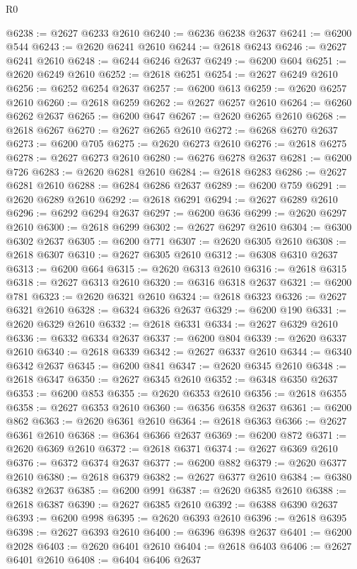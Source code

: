 \begin{lexlean}{R0}
\begin{coremodule}
@6238 := @2627 @6233 @2610
@6240 := @6236 @6238 @2637
@6241 := @6200 @544
@6243 := @2620 @6241 @2610
@6244 := @2618 @6243
@6246 := @2627 @6241 @2610
@6248 := @6244 @6246 @2637
@6249 := @6200 @604
@6251 := @2620 @6249 @2610
@6252 := @2618 @6251
@6254 := @2627 @6249 @2610
@6256 := @6252 @6254 @2637
@6257 := @6200 @613
@6259 := @2620 @6257 @2610
@6260 := @2618 @6259
@6262 := @2627 @6257 @2610
@6264 := @6260 @6262 @2637
@6265 := @6200 @647
@6267 := @2620 @6265 @2610
@6268 := @2618 @6267
@6270 := @2627 @6265 @2610
@6272 := @6268 @6270 @2637
@6273 := @6200 @705
@6275 := @2620 @6273 @2610
@6276 := @2618 @6275
@6278 := @2627 @6273 @2610
@6280 := @6276 @6278 @2637
@6281 := @6200 @726
@6283 := @2620 @6281 @2610
@6284 := @2618 @6283
@6286 := @2627 @6281 @2610
@6288 := @6284 @6286 @2637
@6289 := @6200 @759
@6291 := @2620 @6289 @2610
@6292 := @2618 @6291
@6294 := @2627 @6289 @2610
@6296 := @6292 @6294 @2637
@6297 := @6200 @636
@6299 := @2620 @6297 @2610
@6300 := @2618 @6299
@6302 := @2627 @6297 @2610
@6304 := @6300 @6302 @2637
@6305 := @6200 @771
@6307 := @2620 @6305 @2610
@6308 := @2618 @6307
@6310 := @2627 @6305 @2610
@6312 := @6308 @6310 @2637
@6313 := @6200 @664
@6315 := @2620 @6313 @2610
@6316 := @2618 @6315
@6318 := @2627 @6313 @2610
@6320 := @6316 @6318 @2637
@6321 := @6200 @781
@6323 := @2620 @6321 @2610
@6324 := @2618 @6323
@6326 := @2627 @6321 @2610
@6328 := @6324 @6326 @2637
@6329 := @6200 @190
@6331 := @2620 @6329 @2610
@6332 := @2618 @6331
@6334 := @2627 @6329 @2610
@6336 := @6332 @6334 @2637
@6337 := @6200 @804
@6339 := @2620 @6337 @2610
@6340 := @2618 @6339
@6342 := @2627 @6337 @2610
@6344 := @6340 @6342 @2637
@6345 := @6200 @841
@6347 := @2620 @6345 @2610
@6348 := @2618 @6347
@6350 := @2627 @6345 @2610
@6352 := @6348 @6350 @2637
@6353 := @6200 @853
@6355 := @2620 @6353 @2610
@6356 := @2618 @6355
@6358 := @2627 @6353 @2610
@6360 := @6356 @6358 @2637
@6361 := @6200 @862
@6363 := @2620 @6361 @2610
@6364 := @2618 @6363
@6366 := @2627 @6361 @2610
@6368 := @6364 @6366 @2637
@6369 := @6200 @872
@6371 := @2620 @6369 @2610
@6372 := @2618 @6371
@6374 := @2627 @6369 @2610
@6376 := @6372 @6374 @2637
@6377 := @6200 @882
@6379 := @2620 @6377 @2610
@6380 := @2618 @6379
@6382 := @2627 @6377 @2610
@6384 := @6380 @6382 @2637
@6385 := @6200 @991
@6387 := @2620 @6385 @2610
@6388 := @2618 @6387
@6390 := @2627 @6385 @2610
@6392 := @6388 @6390 @2637
@6393 := @6200 @998
@6395 := @2620 @6393 @2610
@6396 := @2618 @6395
@6398 := @2627 @6393 @2610
@6400 := @6396 @6398 @2637
@6401 := @6200 @2028
@6403 := @2620 @6401 @2610
@6404 := @2618 @6403
@6406 := @2627 @6401 @2610
@6408 := @6404 @6406 @2637

\end{coremodule}
\end{lexlean}
